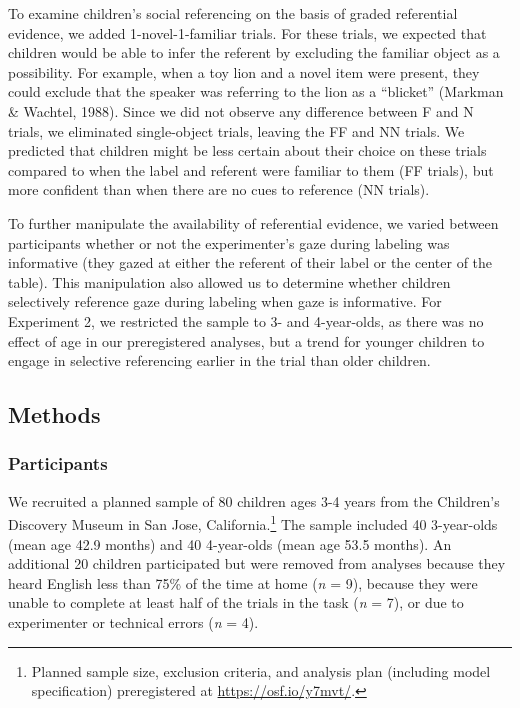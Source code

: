 \documentclass[a4paper,man,apacite,floatsintext]{apa6}
\begin{document}
To examine children's social referencing on the basis of graded
referential evidence, we added 1-novel-1-familiar trials. For these
trials, we expected that children would be able to infer the referent by
excluding the familiar object as a possibility. For example, when a toy
lion and a novel item were present, they could exclude that the speaker
was referring to the lion as a ``blicket'' (Markman \& Wachtel, 1988).
Since we did not observe any difference between F and N trials, we
eliminated single-object trials, leaving the FF and NN trials. We
predicted that children might be less certain about their choice on
these trials compared to when the label and referent were familiar to
them (FF trials), but more confident than when there are no cues to
reference (NN trials).

To further manipulate the availability of referential evidence, we
varied between participants whether or not the experimenter's gaze
during labeling was informative (they gazed at either the referent of
their label or the center of the table). This manipulation also allowed
us to determine whether children selectively reference gaze during
labeling when gaze is informative. For Experiment 2, we restricted the
sample to 3- and 4-year-olds, as there was no effect of age in our
preregistered analyses, but a trend for younger children to engage in
selective referencing earlier in the trial than older children.

\subsection{Methods}\label{methods-1}

\subsubsection{Participants}\label{participants-1}

We recruited a planned sample of 80 children ages 3-4 years from the
Children's Discovery Museum in San Jose, California.\footnote{Planned
  sample size, exclusion criteria, and analysis plan (including model
  specification) preregistered at \url{https://osf.io/y7mvt/}.} The
sample included 40 3-year-olds (mean age 42.9 months) and 40 4-year-olds
(mean age 53.5 months). An additional 20 children participated but were
removed from analyses because they heard English less than 75\% of the
time at home (\emph{n} = 9), because they were unable to complete at
least half of the trials in the task (\emph{n} = 7), or due to
experimenter or technical errors (\emph{n} = 4).
\end{document}
